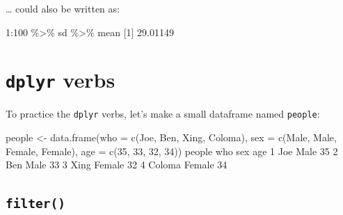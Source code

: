 \documentclass[
]{book}
\newenvironment{Shaded}{\begin{snugshade}}{\end{snugshade}}
\newcommand{\AttributeTok}[1]{\textcolor[rgb]{0.77,0.63,0.00}{#1}}
\newcommand{\DecValTok}[1]{\textcolor[rgb]{0.00,0.00,0.81}{#1}}
\newcommand{\FloatTok}[1]{\textcolor[rgb]{0.00,0.00,0.81}{#1}}
\newcommand{\FunctionTok}[1]{\textcolor[rgb]{0.00,0.00,0.00}{#1}}
\newcommand{\NormalTok}[1]{#1}
\newcommand{\OtherTok}[1]{\textcolor[rgb]{0.56,0.35,0.01}{#1}}
\newcommand{\SpecialCharTok}[1]{\textcolor[rgb]{0.00,0.00,0.00}{#1}}
\newcommand{\StringTok}[1]{\textcolor[rgb]{0.31,0.60,0.02}{#1}}
\begin{document}
\ldots{} could also be written as:

\begin{Shaded}
\begin{Highlighting}[]
\DecValTok{1}\SpecialCharTok{:}\DecValTok{100} \SpecialCharTok{\%\textgreater{}\%}\NormalTok{ sd }\SpecialCharTok{\%\textgreater{}\%}\NormalTok{ mean}
\NormalTok{[}\DecValTok{1}\NormalTok{] }\FloatTok{29.01149}
\end{Highlighting}
\end{Shaded}

\hypertarget{dplyr-verbs}{%
\section*{\texorpdfstring{\texttt{dplyr} verbs}{dplyr verbs}}\label{dplyr-verbs}}

To practice the \texttt{dplyr} verbs, let's make a small dataframe named \texttt{people}:

\begin{Shaded}
\begin{Highlighting}[]
\NormalTok{people }\OtherTok{\textless{}{-}} \FunctionTok{data.frame}\NormalTok{(}\AttributeTok{who =} \FunctionTok{c}\NormalTok{(}\StringTok{\textquotesingle{}Joe\textquotesingle{}}\NormalTok{, }\StringTok{\textquotesingle{}Ben\textquotesingle{}}\NormalTok{, }\StringTok{\textquotesingle{}Xing\textquotesingle{}}\NormalTok{, }\StringTok{\textquotesingle{}Coloma\textquotesingle{}}\NormalTok{),}
                    \AttributeTok{sex =} \FunctionTok{c}\NormalTok{(}\StringTok{\textquotesingle{}Male\textquotesingle{}}\NormalTok{, }\StringTok{\textquotesingle{}Male\textquotesingle{}}\NormalTok{, }\StringTok{\textquotesingle{}Female\textquotesingle{}}\NormalTok{, }\StringTok{\textquotesingle{}Female\textquotesingle{}}\NormalTok{),}
                    \AttributeTok{age =} \FunctionTok{c}\NormalTok{(}\DecValTok{35}\NormalTok{, }\DecValTok{33}\NormalTok{, }\DecValTok{32}\NormalTok{, }\DecValTok{34}\NormalTok{))}
\NormalTok{people}
\NormalTok{     who    sex age}
\DecValTok{1}\NormalTok{    Joe   Male  }\DecValTok{35}
\DecValTok{2}\NormalTok{    Ben   Male  }\DecValTok{33}
\DecValTok{3}\NormalTok{   Xing Female  }\DecValTok{32}
\DecValTok{4}\NormalTok{ Coloma Female  }\DecValTok{34}
\end{Highlighting}
\end{Shaded}

\hypertarget{filter}{%
\subsection*{\texorpdfstring{\texttt{filter()}}{filter()}}\label{filter}}
\end{document}
